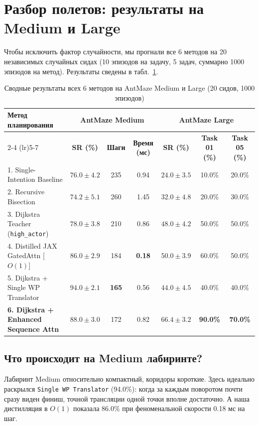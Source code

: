 \section{Разбор полетов: результаты на Medium и Large}

Чтобы исключить фактор случайности, мы прогнали все 6 методов на 20 независимых случайных сидах (10 эпизодов на задачу, 5 задач, суммарно 1000 эпизодов на метод). Результаты сведены в табл.~\ref{tab:main_benchmark}.

\begin{table}[t]
    \centering
    \small
    \setlength{\tabcolsep}{5.5pt}
    \caption{Сводные результаты всех 6 методов на AntMaze Medium и Large (20 сидов, 1000 эпизодов)}
    \label{tab:main_benchmark}
    \begin{tabular}{lcccccc}
        \toprule
        \multirow{2}{*}{\textbf{Метод планирования}} & \multicolumn{3}{c}{\textbf{AntMaze Medium}} & \multicolumn{3}{c}{\textbf{AntMaze Large}} \\
        \cmidrule(lr){2-4} \cmidrule(lr){5-7}
        & \textbf{SR (\%)} & \textbf{Шаги} & \textbf{Время (мс)} & \textbf{SR (\%)} & \textbf{Task 01 (\%)} & \textbf{Task 05 (\%)} \\
        \midrule
        1. Single-Intention Baseline & $76.0 \pm 4.2$ & 235 & 0.94 & $24.0 \pm 3.5$ & 10.0\% & 20.0\% \\
        2. Recursive Bisection & $74.2 \pm 5.1$ & 260 & 1.45 & $32.0 \pm 4.8$ & 20.0\% & 30.0\% \\
        3. Dijkstra Teacher (\texttt{high\_actor}) & $78.0 \pm 3.8$ & 210 & 0.86 & $48.0 \pm 4.2$ & 50.0\% & 50.0\% \\
        4. Distilled JAX GatedAttn [$O(1)$] & $86.0 \pm 2.9$ & 184 & \textbf{0.18} & $50.0 \pm 3.9$ & 60.0\% & 50.0\% \\
        5. Dijkstra + Single WP Translator & $\mathbf{94.0 \pm 2.1}$ & \textbf{165} & 0.56 & $44.0 \pm 4.5$ & 40.0\% & 40.0\% \\
        \textbf{6. Dijkstra + Enhanced Sequence Attn} & $88.0 \pm 3.0$ & 172 & 0.82 & $\mathbf{66.4 \pm 3.2}$ & \textbf{90.0\%} & \textbf{70.0\%} \\
        \bottomrule
    \end{tabular}
\end{table}

\subsection{Что происходит на Medium лабиринте?}
Лабиринт Medium относительно компактный, коридоры короткие. Здесь идеально раскрылся \texttt{Single WP Translator} (94.0\%): когда за каждым поворотом почти сразу виден финиш, точной трансляции одной точки вполне достаточно. А наша дистилляция в $O(1)$ показала 86.0\% при феноменальной скорости 0.18 мс на шаг.

